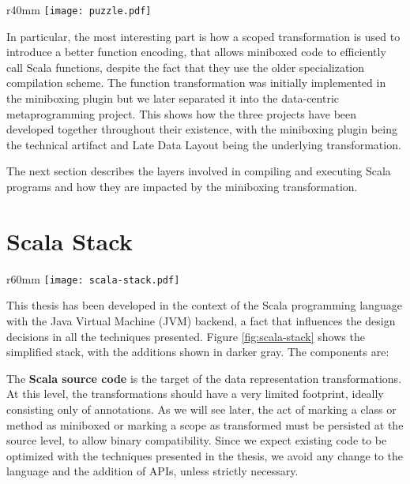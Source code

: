 \begin{wrapfigure}{r}{40mm}
  \centering
  \vspace{-2.5em}
  \texttt{[image: puzzle.pdf]}
  \caption{Miniboxing Component Puzzle}
  \vspace{-2em}
\end{wrapfigure}

In particular, the most interesting part is how a scoped transformation is used to introduce a better function encoding, that allows miniboxed code to efficiently call Scala functions, despite the fact that they use the older  specialization compilation scheme. The function transformation was initially implemented in the miniboxing plugin but we later separated it into the data-centric metaprogramming project. This shows how the three projects have been developed together throughout their existence, with the miniboxing plugin being the technical artifact and Late Data Layout being the underlying transformation.

The next section describes the layers involved in compiling and executing Scala programs and how they are impacted by the miniboxing transformation.

\section{Scala Stack}

\begin{wrapfigure}{r}{60mm}
  \centering
  \vspace{-2.5em}
  \texttt{[image: scala-stack.pdf]}
  \caption{Scala Stack}
  \label{fig:scala-stack}
  \vspace{-2em}
\end{wrapfigure}

This thesis has been developed in the context of the Scala programming language with the Java Virtual Machine (JVM) backend, a fact that influences the design decisions in all the techniques presented. Figure \ref{fig:scala-stack} shows the simplified stack, with the additions shown in darker gray. The components are:

The \textbf{Scala source code} is the target of the data representation transformations. At this level, the transformations should have a very limited footprint, ideally consisting only of annotations. As we will see later, the act of marking a class or method as miniboxed or marking a scope as transformed must be persisted at the source level, to allow binary compatibility. Since we expect existing code to be optimized with the techniques presented in the thesis, we avoid any change to the language and the addition of APIs, unless strictly necessary.

